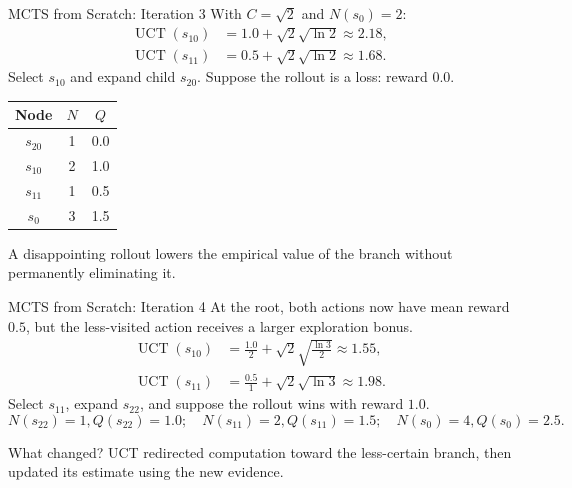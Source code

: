 \documentclass[aspectratio=169,10pt]{beamer}
\begin{document}
\begin{frame}[shrink=14]{MCTS from Scratch: Iteration 3}
  With $C=\sqrt{2}$ and $N(s_0)=2$:
  \begin{align*}
    \operatorname{UCT}(s_{10})
      &= 1.0 + \sqrt{2}\sqrt{\ln 2}
      \approx 2.18,\\
    \operatorname{UCT}(s_{11})
      &= 0.5 + \sqrt{2}\sqrt{\ln 2}
      \approx 1.68.
  \end{align*}
  Select $s_{10}$ and expand child $s_{20}$. Suppose the rollout is a loss: reward $0.0$.
  \begin{center}
  \renewcommand{\arraystretch}{1.20}
  \begin{tabular}{c|c|c}
    \textbf{Node} & $N$ & $Q$ \\ \hline
    $s_{20}$ & 1 & 0.0 \\
    $s_{10}$ & 2 & 1.0 \\
    $s_{11}$ & 1 & 0.5 \\
    $s_0$    & 3 & 1.5
  \end{tabular}
  \end{center}
  \begin{keyidea}
    A disappointing rollout lowers the empirical value of the branch without permanently eliminating it.
  \end{keyidea}
\end{frame}

\begin{frame}[shrink=13]{MCTS from Scratch: Iteration 4}
  At the root, both actions now have mean reward $0.5$, but the less-visited action receives a larger exploration bonus.
  \begin{align*}
    \operatorname{UCT}(s_{10})
      &= \frac{1.0}{2}+\sqrt{2}\sqrt{\frac{\ln 3}{2}}
      \approx 1.55,\\
    \operatorname{UCT}(s_{11})
      &= \frac{0.5}{1}+\sqrt{2}\sqrt{\ln 3}
      \approx 1.98.
  \end{align*}
  Select $s_{11}$, expand $s_{22}$, and suppose the rollout wins with reward $1.0$.
  \[
    N(s_{22})=1,Q(s_{22})=1.0;
    \quad N(s_{11})=2,Q(s_{11})=1.5;
    \quad N(s_0)=4,Q(s_0)=2.5.
  \]
  \begin{block}{What changed?}
    UCT redirected computation toward the less-certain branch, then updated its estimate using the new evidence.
  \end{block}
\end{frame}
\end{document}
